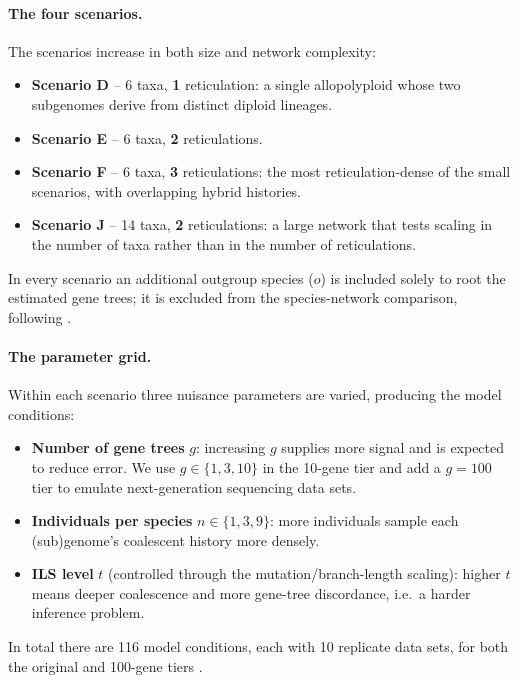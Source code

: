 \documentclass{article}
\begin{document}
\paragraph{The four scenarios.} The scenarios increase in both size and
network complexity:
\begin{itemize}
    \item \textbf{Scenario D} -- 6 taxa, \textbf{1} reticulation: a single
    allopolyploid whose two subgenomes derive from distinct diploid lineages.
    \item \textbf{Scenario E} -- 6 taxa, \textbf{2} reticulations.
    \item \textbf{Scenario F} -- 6 taxa, \textbf{3} reticulations: the most
    reticulation-dense of the small scenarios, with overlapping hybrid
    histories.
    \item \textbf{Scenario J} -- 14 taxa, \textbf{2} reticulations: a large
    network that tests scaling in the number of taxa rather than in the number
    of reticulations.
\end{itemize}
In every scenario an additional outgroup species ($o$) is included solely to
root the estimated gene trees; it is excluded from the species-network
comparison, following \cite{YanAllop}.

\paragraph{The parameter grid.} Within each scenario three nuisance parameters
are varied, producing the model conditions:
\begin{itemize}
    \item \textbf{Number of gene trees} $g$: increasing $g$ supplies more signal
    and is expected to reduce error. We use $g \in \{1, 3, 10\}$ in the
    10-gene tier and add a $g = 100$ tier to emulate next-generation
    sequencing data sets.
    \item \textbf{Individuals per species} $n \in \{1, 3, 9\}$: more individuals
    sample each (sub)genome's coalescent history more densely.
    \item \textbf{ILS level} $t$ (controlled through the mutation/branch-length
    scaling): higher $t$ means deeper coalescence and more gene-tree
    discordance, i.e.\ a harder inference problem.
\end{itemize}
In total there are 116 model conditions, each with 10 replicate data sets, for
both the original and 100-gene tiers \cite{YanAllop}.
\end{document}
